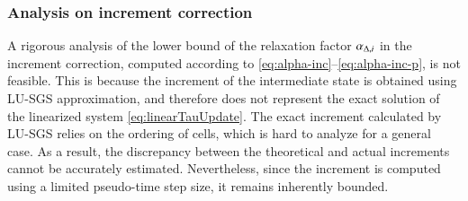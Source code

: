 
\subsubsection{Analysis on increment correction}

A rigorous analysis of the lower bound of the relaxation factor $\alpha_{\mathrm\Delta,i}$ in the increment correction, computed according to \eqref{eq:alpha-inc}–\eqref{eq:alpha-inc-p}, is not feasible. 
This is because the increment of the intermediate state is obtained using LU-SGS approximation, and therefore does not represent the exact solution of the linearized system \eqref{eq:linearTauUpdate}. 
The exact increment calculated by LU-SGS relies on 
the ordering of cells, which is hard to analyze 
for a general case.
As a result, the discrepancy between the theoretical and actual increments cannot be accurately estimated. 
Nevertheless, since the increment is computed using a limited pseudo-time step size, it remains inherently bounded. 

